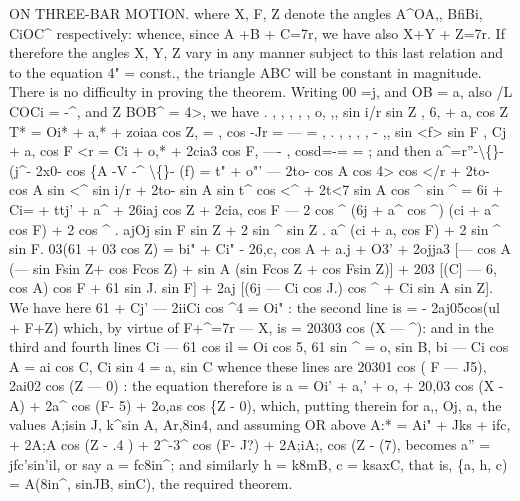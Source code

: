 \documentclass[12pt,a4paper]{article}
\begin{document}
ON THREE-BAR MOTION.
where X,
F, Z
denote
the
angles
A\textasciicircum{}OA,,
BfiBi,
CiOC\textasciicircum{}
respectively:
whence,
since
A +B + C=7r, we
have
also X+Y + Z=7r.
If
therefore
the
angles X,
Y, Z vary
in
any
manner
subject
to
this
last
relation and
to
the equation
4" = const., the triangle
ABC
will be
constant
in
magnitude.
There
is
no
difficulty
in proving the
theorem.
Writing 00 =j, and OB = a, also
/L COCi = -\textasciicircum{}, and
Z BOB\textasciicircum{} = 4>, we have
.
, ,
,
,
,
o,
,,
sin i/r
sin Z
,
6, + a, cos Z
T* = Oi* + a,* + zoiaa cos Z,
=
,
cos -Jr = ---
=
,
.
,
,
,
, -
,,
sin
<f>
sin F
,
Cj + a, cos F
<r\guillemotright{} = Ci\guillemotright{} + o,* + 2cia3 cos F,
----
,
cosd\guillemotright{}=-=
=
;
and then
a\textasciicircum{}=r''-\textbackslash\{\}-(j\textasciicircum{}- 2x0- cos \{A -V -\textasciicircum{} \textbackslash\{\}- (f)
= t" + o"' --- 2to- cos A cos 4> cos \textbullet{}</r + 2to- cos A sin <\textasciicircum{} sin i/r
+ 2to- sin A sin t\textasciicircum{} cos <\textasciicircum{} + 2t<7 sin A cos \textasciicircum{} sin \textasciicircum{}
= 6i\guillemotright{} + Ci= + ttj' + a\textasciicircum{} + 26iaj cos Z + 2cia, cos F
--- 2 cos \textasciicircum{} (6j + a\textasciicircum{} cos \textasciicircum{}) (ci + a\textasciicircum{} cos F)
+ 2 cos \textasciicircum{}
. ajOj sin F sin Z
+ 2 sin \textasciicircum{} sin Z
. a\textasciicircum{} (ci + a, cos F)
+ 2 sin \textasciicircum{} sin F. 03(61 + 03 cos Z)
= bi" + Ci" - 26,c, cos A + a.j\guillemotright{} + O3'
+ 2ojja3 [--- cos A (--- sin Fsin Z+ cos Fcos Z)
+ sin A (sin Fcos Z + cos Fsin Z)]
+ 203 [(C] --- 6, cos A) cos F + 61 sin J. sin F]
+ 2aj [(6j --- Ci cos J.) cos \textasciicircum{} + Ci sin A sin Z].
We have
here
61\textdegree{} + Cj' --- 2i\guillemotright{}iCi cos \textasciicircum{}4 = Oi"
:
the second
line
is = - 2aj05cos(ul + F+Z)
which, by virtue
of F+\textasciicircum{}=7r --- X,
is = 20303 cos (X --- \textasciicircum{}):
and
in
the
third
and
fourth
lines
Ci --- 61 cos il = Oi cos 5,
61 sin \textasciicircum{} = o, sin B,
bi --- Ci cos A = ai cos C,
Ci sin 4 = a, sin C
whence
these
lines are
20301 cos ( F --- J5),
2ai02 cos (Z --- 0)
:
the equation
therefore
is
a\guillemotright{} = Oi' + a,' + o,\guillemotright{} + 20,03 cos (X -A) + 2a\textasciicircum{} cos (F- 5) + 2o,as cos \{Z - 0),
which,
putting
therein
for
a,,
Oj,
a,
the values
A;isin J, k\textasciicircum{}sin A, Ar,8in4, and assuming
OR above
A:* = Ai" + Jks\guillemotright{} + ifc,\guillemotright{} + 2A;A cos (Z - .4 ) + 2\textasciicircum{}-3\textasciicircum{} cos (F- J?) + 2A;iA;, cos (Z - (7),
becomes
a'' = jfc'sin'il,
or
say
a = fc8in\textasciicircum{};
and
similarly
h = k8mB,
c = ksaxC,
that
is,
\{a,
h,
c) = A(8in\textasciicircum{}, sinJB, sinC), the
required theorem.
\end{document}
